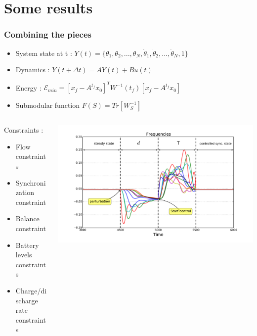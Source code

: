 \documentclass[xcolor=dvipsnames]{beamer}
\begin{document}
\section{Some results}
\begin{frame}
	\tableofcontents[currentsection]
\end{frame}

\begin{frame}
	\frametitle{Combining the pieces}

	\begin{itemize}
				\item System state at t : $ Y(t) = \{ \theta_1,\theta_2,...,\theta_N,\dot{\theta}_1,\dot{\theta}_2,...,\dot{\theta}_N,1\} $
				\item Dynamics : $ Y(t+\Delta t) = A Y(t) + B u(t) $
				\item Energy : $ \mathcal{E}_{min}= \left[ x_f - A^{t_f}x_0 \right]^{T}W^{-1}(t_f)\left[ x_f - A^{t_f}x_0 \right] $
				\item Submodular function $F(S) = Tr[W_S^{-1}]$
	\end{itemize}
	
	\begin{columns}
		\begin{column}{.4\textwidth}
			
				Constraints :
				\begin{itemize}
					\item Flow constraints %
					\item Synchronization constraint %
					\item Balance constraint %
					\item Battery levels constraints %
					\item Charge/discharge rate constraints %
				\end{itemize}
		\end{column}
		\begin{column}{.6\textwidth}
			\includegraphics[scale=.3]{figure_2}
		\end{column}
	\end{columns}
\end{frame}
\end{document}
